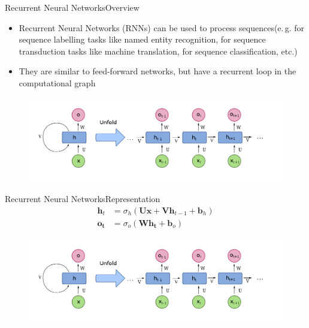 \begin{frame}{Recurrent Neural Networks}{Overview}
	\begin{itemize}
		\item Recurrent Neural Networks (RNNs) can be used to process sequences\newline (e.\,g. for sequence labelling tasks like named entity recognition, for sequence transduction tasks like machine translation, for sequence classification, etc.)
		\item They are similar to feed-forward networks, but have a recurrent loop in the computational graph
	\end{itemize}
	\begin{figure}
		\centering
		\includegraphics[scale=0.25]{10_deep_learning/02_img/rnn}
	\end{figure}
\end{frame}

\begin{frame}{Recurrent Neural Networks}{Representation}
	\begin{align*}
		\bm{h}_t &= \sigma_h(\bm{U} \bm{x} + \bm{V} \bm{h}_{t - 1} + \bm{b}_h)\\
		\bm{o_t} &= \sigma_o(\bm{W} \bm{h_t} + \bm{b}_o)
	\end{align*}
	\begin{figure}
		\centering
		\includegraphics[scale=0.25]{10_deep_learning/02_img/rnn}
	\end{figure}
\end{frame}

